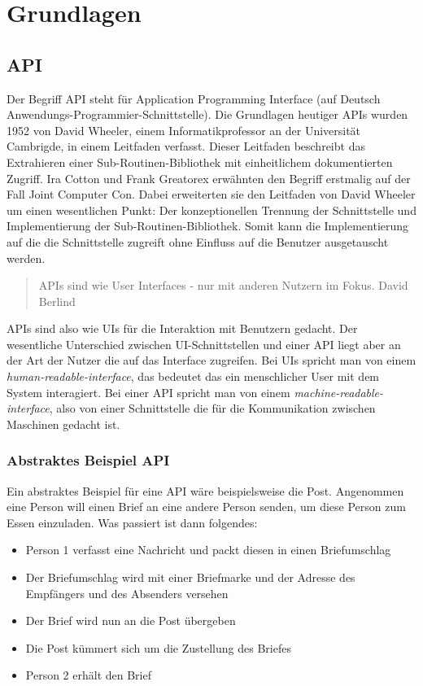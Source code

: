 \chapter{Grundlagen}
\section{API}

Der Begriff API steht für Application Programming Interface (auf Deutsch Anwendungs-Programmier-Schnittstelle).
Die Grundlagen heutiger APIs wurden 1952 von David Wheeler, einem Informatikprofessor an der Universität Cambrigde, in einem Leitfaden verfasst.
Dieser Leitfaden beschreibt das Extrahieren einer Sub-Routinen-Bibliothek mit einheitlichem dokumentierten Zugriff. \cite{wheeler1952use}
Ira Cotton und Frank Greatorex erwähnten den Begriff erstmalig auf der Fall Joint Computer Con.\cite{cotton1968data}
Dabei erweiterten sie den Leitfaden von David Wheeler um einen wesentlichen Punkt: Der konzeptionellen Trennung der Schnittstelle und Implementierung der Sub-Routinen-Bibliothek.
Somit kann die Implementierung auf die die Schnittstelle zugreift ohne Einfluss auf die Benutzer ausgetauscht werden.\cite{kress2020graphql}

\begin{quote}
APIs sind wie User Interfaces - nur mit anderen Nutzern im Fokus. David Berlind \cite{berlind2017apis}
\end{quote}

APIs sind also wie UIs für die Interaktion mit Benutzern gedacht.
Der wesentliche Unterschied zwischen UI-Schnittstellen und einer API liegt aber an der Art der Nutzer die auf das Interface zugreifen.
Bei UIs spricht man von einem \textit{human-readable-interface}, das bedeutet das ein menschlicher User mit dem System interagiert.
Bei einer API spricht man von einem \textit{machine-readable-interface}, also von einer Schnittstelle die für die Kommunikation zwischen Maschinen gedacht ist.

\subsection{Abstraktes Beispiel API}
Ein abstraktes Beispiel für eine API wäre beispielsweise die Post. Angenommen eine Person will einen Brief an eine andere Person senden, um diese Person zum Essen einzuladen. Was passiert ist dann folgendes:
\begin{itemize}
 \item Person 1 verfasst eine Nachricht und packt diesen in einen Briefumschlag
 \item Der Briefumschlag wird mit einer Briefmarke und der Adresse des Empfängers und des Absenders versehen
 \item Der Brief wird nun an die Post übergeben
 \item Die Post kümmert sich um die Zustellung des Briefes
 \item Person 2 erhält den Brief
\end{itemize}

